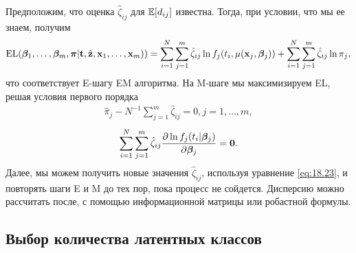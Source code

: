 Предположим, что оценка $\hat{\zeta}_{ij}$ для $\mathbb{E}[d_{ij}]$ известна. %
Тогда, при условии, что мы ее знаем, получим
    \begin{align}
        \label{eq:18.24}
        \mathrm{EL}(\bm{\beta}_1, \ldots, \bm{\beta}_m,\bm{\pi}|\mathbf{t},\hat{\mathbf{z}},\mathbf{x}_1, \ldots, \mathbf{x}_m)) = \sum^{N}_{i=1}\sum^{m}_{j=1} \hat{\zeta}_{ij}\ln f_j(t_i, \mu(\mathbf{x}_j,\bm{\beta}_j)) + \sum^{N}_{i=1}\sum^{m}_{j=1} \hat{\zeta}_{ij}\ln\pi_j,
    \end{align}
что соответствует E-шагу EM алгоритма. На M-шаге мы максимизируем EL, решая условия первого порядка
    \begin{align}
        \label{eq:18.25}
        \hat{\pi}_j - N^{-1}\sum^{m}_{j=1} \hat{\zeta}_{ij} = 0, j = 1, \ldots, m,
    \end{align}
    \begin{align}
        \label{eq:18.26}
        \sum^{N}_{i=1}\sum^{m}_{j=1} \hat{\zeta}_{ij} \frac{\partial\ln f_j(t_i|\bm{\beta}_j)}{\partial\bm{\beta}_j} = \mathbf{0}.
    \end{align}
Далее, мы можем получить новые значения $\hat{\zeta}_{ij}$, используя уравнение \ref{eq:18.23}, и повторять шаги E и M до тех пор, пока процесс не сойдется.
Дисперсию можно рассчитать после, с помощью информационной матрицы или робастной формулы. %


\subsection{Выбор количества латентных классов}\label{sec:18.5.4}

